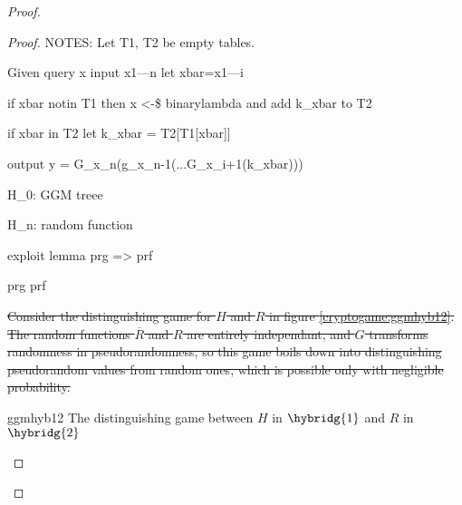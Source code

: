 \begin{proof}
\begin{proof}
{        NOTES: Let T1, T2 be empty tables.

        Given query x input x1---n let xbar=x1---i

        if xbar notin T1 then x <-\$ binarylambda and add k\_xbar to T2

        if xbar in T2 let k\_xbar = T2[T1[xbar]]

        output y = G\_x\_n(g\_x\_n-1(...G\_x\_i+1(k\_xbar)))

        H\_0: GGM treee
        
        H\_n: random function

        exploit lemma prg => prf
        }
        
        \begin{cryptoredux}
            {}
            {}
            {prg}
            {prf}

            \cseqbeginloop

            \return{}{}{}

            \receive{}{}{}

            \invoke{}{}{}

            \cseqendloop


            
        \end{cryptoredux}
        
        \sout{Consider the distinguishing game for $H$ and $R$ in figure \ref{cryptogame:ggmhyb12}. The random functions $\overline{R}$ and $R$ are entirely independant, and $G$ transforms randomness in pseudorandomness, so this game boils down into distinguishing pseudorandom values from random ones, which is possible only with negligible probability.}
        
        \begin{cryptogame}
            {ggmhyb12}
            {The distinguishing game between $H$ in $\hybridg{1}$ and $R$ in $\hybridg{2}$}
            {}


            \cseqdelay


            \cseqdelay


\end{cryptogame}
\end{proof}
\end{proof}
